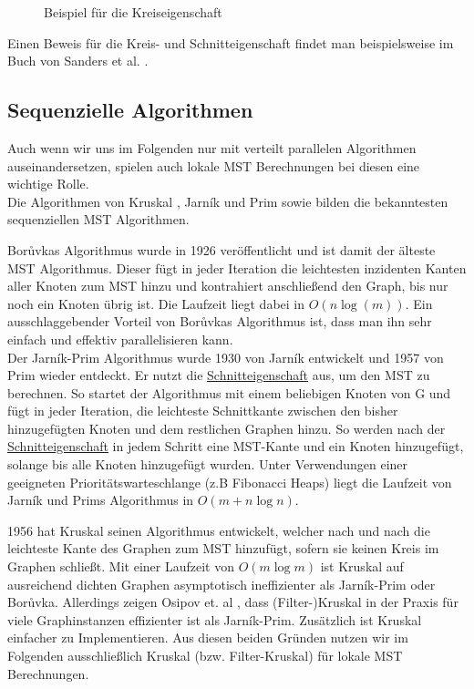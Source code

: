 \begin{figure}[H]
    \centering
    
    \caption{Beispiel für die Kreiseigenschaft}
    \label{Kreis-Img}
\end{figure}


Einen Beweis für die Kreis- und Schnitteigenschaft findet man beispielsweise im Buch von Sanders et al. \cite{sanders2019sequential}.



\subsection{Sequenzielle Algorithmen}
Auch wenn wir uns im Folgenden nur mit verteilt parallelen Algorithmen auseinandersetzen, spielen auch lokale MST Berechnungen bei diesen eine wichtige Rolle.\\
Die Algorithmen von Kruskal \cite{kruskal1956shortest}, Jarník und Prim \cite{prim1957shortest} sowie \boruvka \cite{boruuvka1926jistem} bilden die bekanntesten sequenziellen MST Algorithmen.

Bor{\r u}vkas Algorithmus wurde in 1926 veröffentlicht und ist damit der älteste MST Algorithmus. Dieser fügt in jeder Iteration die leichtesten inzidenten Kanten aller Knoten zum MST hinzu und kontrahiert anschließend den Graph, bis nur noch ein Knoten übrig ist. Die Laufzeit liegt dabei in $O(n \log(m))$.
Ein ausschlaggebender Vorteil von Bor{\r u}vkas Algorithmus ist, dass man ihn sehr einfach und effektiv parallelisieren kann.\\

Der Jarník-Prim Algorithmus wurde 1930 von Jarník entwickelt und 1957 von Prim wieder entdeckt. Er nutzt die \hyperref[Schnitteigenschaft]{Schnitteigenschaft} aus, um den MST zu berechnen. So startet der Algorithmus mit einem beliebigen Knoten von G und fügt in jeder Iteration, die leichteste Schnittkante zwischen den bisher hinzugefügten Knoten und dem restlichen Graphen hinzu. So werden nach der \hyperref[Schnitteigenschaft]{Schnitteigenschaft} in jedem Schritt eine MST-Kante und ein Knoten hinzugefügt, solange bis alle Knoten hinzugefügt wurden. Unter Verwendungen einer geeigneten Prioritätswarteschlange (z.B Fibonacci Heaps) liegt die Laufzeit von Jarník und Prims Algorithmus in $O(m+n\log n)$.

1956 hat Kruskal seinen Algorithmus entwickelt, welcher nach und nach die leichteste Kante des Graphen zum MST hinzufügt, sofern sie keinen Kreis im Graphen schließt. 
Mit einer Laufzeit von $O(m\log m)$ ist Kruskal auf ausreichend dichten Graphen asymptotisch ineffizienter als Jarník-Prim oder Bor{\r u}vka. 
Allerdings zeigen Osipov et. al \cite{osipov2009filter}, dass (Filter-)Kruskal in der Praxis für viele Graphinstanzen effizienter ist als Jarník-Prim. 
Zusätzlich ist Kruskal einfacher zu Implementieren. Aus diesen beiden Gründen nutzen wir im Folgenden ausschließlich Kruskal (bzw. Filter-Kruskal) für lokale MST Berechnungen.


